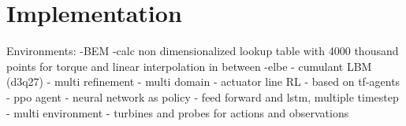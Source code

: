 \section{Implementation}
Environments:
	-BEM
		-calc non dimensionalized lookup table with 4000 thousand points for torque and linear interpolation in between
	-elbe
		- cumulant LBM (d3q27)
		- multi refinement
		- multi domain
		- actuator line
RL
	- based on tf-agents
	- ppo agent
		- neural network as policy
		- feed forward and lstm, multiple timestep
	- multi environment
		- turbines and probes for actions and observations
	